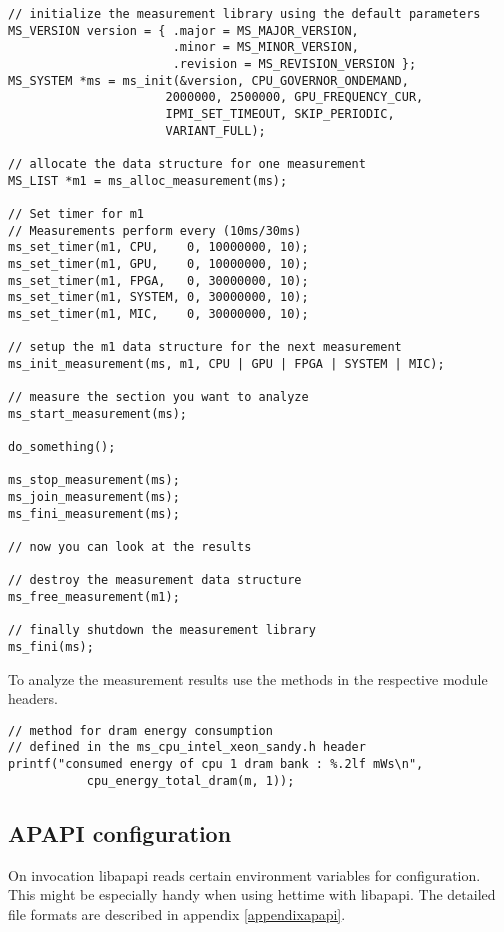 \begin{lstlisting}
// initialize the measurement library using the default parameters
MS_VERSION version = { .major = MS_MAJOR_VERSION,
                       .minor = MS_MINOR_VERSION,
                       .revision = MS_REVISION_VERSION };
MS_SYSTEM *ms = ms_init(&version, CPU_GOVERNOR_ONDEMAND,
                      2000000, 2500000, GPU_FREQUENCY_CUR, 
                      IPMI_SET_TIMEOUT, SKIP_PERIODIC,
                      VARIANT_FULL);

// allocate the data structure for one measurement
MS_LIST *m1 = ms_alloc_measurement(ms);

// Set timer for m1
// Measurements perform every (10ms/30ms)
ms_set_timer(m1, CPU,    0, 10000000, 10);
ms_set_timer(m1, GPU,    0, 10000000, 10);
ms_set_timer(m1, FPGA,   0, 30000000, 10);
ms_set_timer(m1, SYSTEM, 0, 30000000, 10);
ms_set_timer(m1, MIC,    0, 30000000, 10);

// setup the m1 data structure for the next measurement
ms_init_measurement(ms, m1, CPU | GPU | FPGA | SYSTEM | MIC);

// measure the section you want to analyze
ms_start_measurement(ms);

do_something();

ms_stop_measurement(ms);
ms_join_measurement(ms);
ms_fini_measurement(ms);

// now you can look at the results

// destroy the measurement data structure
ms_free_measurement(m1);

// finally shutdown the measurement library
ms_fini(ms);
\end{lstlisting}

To analyze the measurement results use the methods in the respective module headers.

\begin{lstlisting}
// method for dram energy consumption
// defined in the ms_cpu_intel_xeon_sandy.h header
printf("consumed energy of cpu 1 dram bank : %.2lf mWs\n",
           cpu_energy_total_dram(m, 1));
\end{lstlisting}

\subsection{APAPI configuration}

On invocation libapapi reads certain environment variables for configuration.
This might be especially handy when using hettime with libapapi.
The detailed file formats are described in appendix \ref{appendixapapi}.

